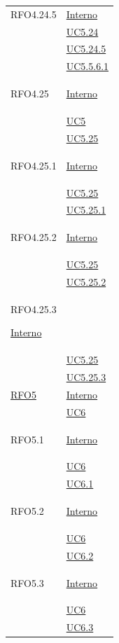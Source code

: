 \begin{longtable}{|>{\centering}m{5cm}|m{5cm}<{\centering}|}
\hypertarget{RFO4.24.5}{RFO4.24.5} & \hyperlink{Interno}{Interno}\\
&\hyperref[UC5.24]{UC5.24}\\
&\hyperref[UC5.24.5]{UC5.24.5}\\ 
&\hyperref[UC5.5.6.1]{UC5.5.6.1}\\ \hline

\hypertarget{RFO4.25}{RFO4.25} & \hyperlink{Interno}{Interno}\\
&\hyperref[UC5]{UC5}\\
&\hyperref[UC5.25]{UC5.25}\\ \hline

\hypertarget{RFO4.25.1}{RFO4.25.1} &  \hyperlink{Interno}{Interno}\\
&\hyperref[UC5.25]{UC5.25}\\
&\hyperref[UC5.25.1]{UC5.25.1}\\ \hline

\hypertarget{RFO4.25.2}{RFO4.25.2} & \hyperlink{Interno}{Interno}\\
&\hyperref[UC5.25]{UC5.25}\\
&\hyperref[UC5.25.2]{UC5.25.2}\\ \hline

\hypertarget{RFO4.25.3}{RFO4.25.3}   \hyperlink{Interno}{Interno}\\
&\hyperref[UC5.25]{UC5.25}\\
&\hyperref[UC5.25.3]{UC5.25.3}\\ \hline

\hyperlink{RFO5}{RFO5} & \hyperlink{Interno}{Interno}\\
& \hyperref[UC6]{UC6}\\ \hline

\hypertarget{RFO5.1}{RFO5.1}&  \hyperlink{Interno}{Interno}\\
& \hyperref[UC6]{UC6}\\ 
& \hyperref[UC6.1]{UC6.1}\\ \hline

\hypertarget{RFO5.2}{RFO5.2} &  \hyperlink{Interno}{Interno}\\
& \hyperref[UC6]{UC6}\\ 
& \hyperref[UC6.2]{UC6.2}\\ \hline

\hypertarget{RFO5.3}{RFO5.3} &  \hyperlink{Interno}{Interno}\\
& \hyperref[UC6]{UC6}\\ 
& \hyperref[UC6.3]{UC6.3}\\ \hline


\end{longtable}
